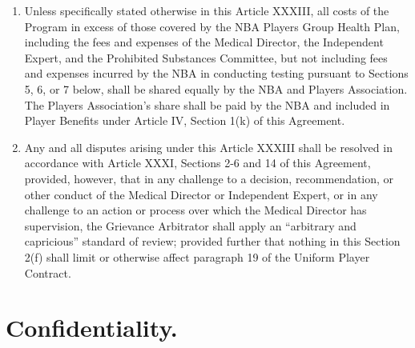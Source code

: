 \documentclass[
]{book}
\begin{document}
\begin{enumerate}
\item
  Unless specifically stated otherwise in this Article XXXIII, all costs of the Program in excess of those covered by the NBA Players Group Health Plan, including the fees and expenses of the Medical Director, the Independent Expert, and the Prohibited Substances Committee, but not including fees and expenses incurred by the NBA in conducting testing pursuant to Sections 5, 6, or 7 below, shall be shared equally by the NBA and Players Association. The Players Association's share shall be paid by the NBA and included in Player Benefits under Article IV, Section 1(k) of this Agreement.
\item
  Any and all disputes arising under this Article XXXIII shall be resolved in accordance with Article XXXI, Sections 2-6 and 14 of this Agreement, provided, however, that in any challenge to a decision, recommendation, or other conduct of the Medical Director or Independent Expert, or in any challenge to an action or process over which the Medical Director has supervision, the Grievance Arbitrator shall apply an ``arbitrary and capricious'' standard of review; provided further that nothing in this Section 2(f) shall limit or otherwise affect paragraph 19 of the Uniform Player Contract.
\end{enumerate}

\hypertarget{confidentiality.}{%
\section{Confidentiality.}\label{confidentiality.}}
\end{document}
